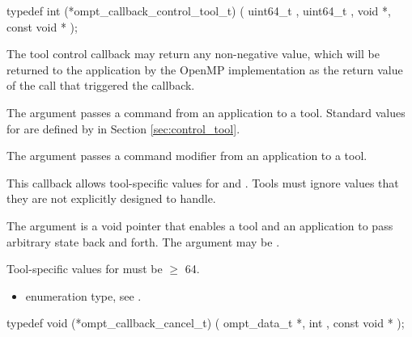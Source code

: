 \begin{ccppspecific}
\begin{omptCallback}
typedef int (*ompt_callback_control_tool_t) (
  uint64_t ,
  uint64_t ,
  void *,
  const void *
);
\end{omptCallback}
\end{ccppspecific}


\descr

The tool control callback may return any non-negative value, which will be returned to the
application by the OpenMP implementation as the return value of the
 call that triggered the callback.

\argdesc

The argument  passes a command from an application
to a tool.  Standard values for  are defined by
 in Section \ref{sec:control_tool}.

The argument  passes a command modifier from an
application to a tool.

This callback allows tool-specific values for  and
.  Tools must ignore  values that they are
not explicitly designed to handle.

The argument  is a void pointer that enables a tool and
an application to pass arbitrary state back and forth.
The argument  may be .

\codeptrdesc


\constraints
Tool-specific values for  must be $\geq$ 64.

\crossreferences
\begin{itemize}
\item {} enumeration type, see .
\end{itemize}

\label{sec:ompt_callback_cancel_t}
\format

\begin{ccppspecific}
\begin{omptCallback}
typedef void (*ompt_callback_cancel_t) (
  ompt_data_t *,
  int ,
  const void *
);
\end{omptCallback}
\end{ccppspecific}


